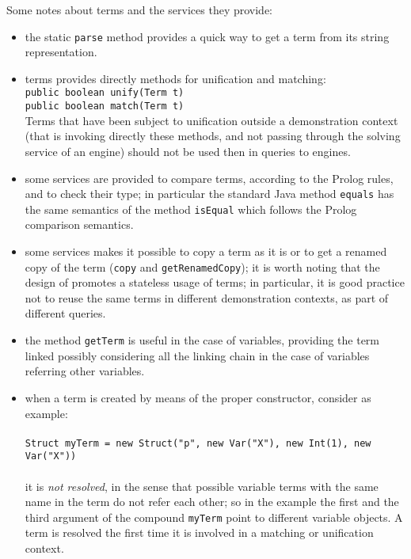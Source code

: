 Some notes about \tuprolog{} terms and the services they provide:
\begin{itemize}
%
\item the static \texttt{parse} method provides a quick way to get a
term from its string representation.
%
\item \tuprolog{} terms provides directly methods for unification and matching: \\
%
{\tt{\small{public boolean unify(Term t)}}}\\
%
{\tt{\small{public boolean match(Term t)}}}\\
%
Terms that have been subject to unification outside a
demonstration context (that is invoking directly these methods,
and not passing through the solving service of an engine) should
not be used then in queries to engines.
%
\item some services are provided to compare terms, according to the
Prolog rules, and to check their type;
%
in particular the standard Java method \texttt{equals} has the
same semantics of the method \texttt{isEqual} which follows the
Prolog comparison semantics.
%
\item some services makes it possible to copy a term as it is
or to get a renamed copy of the term (\texttt{copy} and
\texttt{getRenamedCopy});
%
it is worth noting that the design of \tuprolog{} promotes a
stateless usage of terms; in particular, it is good practice not
to reuse the same terms in different demonstration contexts, as
part of different queries.
%
\item the method \texttt{getTerm} is useful in the case of
variables, providing the term linked possibly considering all the
linking chain in the case of variables referring other variables.
%
\item when a term is created by means of the proper constructor,
consider as example: \\\\
%
{\tt{\scriptsize{Struct myTerm = new Struct("p", new Var("X"), new
Int(1), new Var("X"))}}}\\\\
%
it is \emph{not resolved}, in the sense that possible variable
terms with the same name in the term do not refer each other;
%
so in the example the first and the third argument of the compound
\texttt{myTerm} point to different variable objects.
%
A term is resolved the first time it is involved in a matching or
unification context.
%
\end{itemize}

